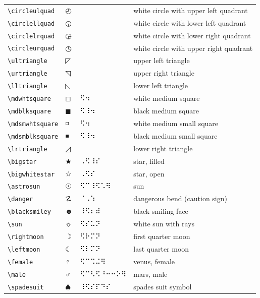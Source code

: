 \documentclass[oneside]{article}
\begin{document}
\begin{longtable}{llll}
\verb|\circleulquad| & $\circleulquad$ &    & {white circle with upper left quadrant} \\[2ex]
\verb|\circlellquad| & $\circlellquad$ &    & {white circle with lower left quadrant} \\[2ex]
\verb|\circlelrquad| & $\circlelrquad$ &    & {white circle with lower right quadrant} \\[2ex]
\verb|\circleurquad| & $\circleurquad$ &    & {white circle with upper right quadrant} \\[2ex]
\verb|\ultriangle| & $\ultriangle$ &    & {upper left triangle} \\[2ex]
\verb|\urtriangle| & $\urtriangle$ &    & {upper right triangle} \\[2ex]
\verb|\lltriangle| & $\lltriangle$ &    & {lower left triangle} \\[2ex]
\verb|\mdwhtsquare| & $\mdwhtsquare$ &  ⠫⠲  & {white medium square} \\[2ex]
\verb|\mdblksquare| & $\mdblksquare$ &  ⠫⠸⠲  & {black medium square} \\[2ex]
\verb|\mdsmwhtsquare| & $\mdsmwhtsquare$ &  ⠫⠲  & {white medium small square} \\[2ex]
\verb|\mdsmblksquare| & $\mdsmblksquare$ &  ⠫⠸⠲  & {black medium small square} \\[2ex]
\verb|\lrtriangle| & $\lrtriangle$ &    & {lower right triangle} \\[2ex]
\verb|\bigstar| & $\bigstar$ &  ⠠⠫⠸⠎  & {star, filled} \\[2ex]
\verb|\bigwhitestar| & $\bigwhitestar$ &  ⠠⠫⠎  & {star, open} \\[2ex]
\verb|\astrosun| & $\astrosun$ &  ⠫⠉⠸⠫⠡⠻  & {sun} \\[2ex]
\verb|\danger| & $\danger$ &  ⠈⠠⠱  & {dangerous bend (caution sign)} \\[2ex]
\verb|\blacksmiley| & $\blacksmiley$ &   ⠸⠫⠆⠾   & {black smiling face} \\[2ex]
\verb|\sun| & $\sun$ &  ⠫⠎⠥⠝  & {white sun with rays} \\[2ex]
\verb|\rightmoon| & $\rightmoon$ &  ⠫⠗⠍⠝  & {first quarter moon} \\[2ex]
\verb|\leftmoon| & $\leftmoon$ &  ⠫⠇⠍⠝  & {last quarter moon} \\[2ex]
\verb|\female| & $\female$ &  ⠫⠉⠩⠬⠻  & {venus, female} \\[2ex]
\verb|\male| & $\male$ &  ⠫⠉⠣⠫⠘⠒⠒⠕⠻  & {mars, male} \\[2ex]
\verb|\spadesuit| & $\spadesuit$ &  ⠸⠫⠎⠏⠙⠎  & {spades suit symbol} \\[2ex]

\end{longtable}
\end{document}

